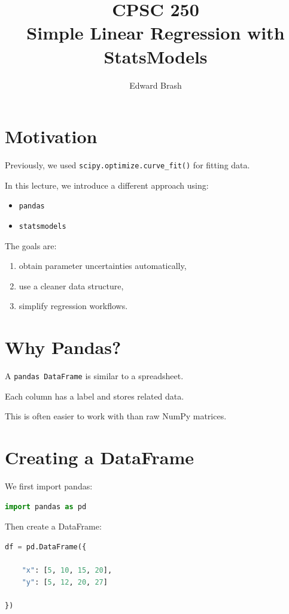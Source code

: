 \documentclass[11pt]{article}
\title{CPSC 250 \\ Simple Linear Regression with StatsModels}
\author{Edward Brash}
\date{}
\begin{document}
\maketitle

\section{Motivation}

Previously, we used \texttt{scipy.optimize.curve\_fit()} for fitting data.

In this lecture, we introduce a different approach using:

\begin{itemize}
    \item \texttt{pandas}
    \item \texttt{statsmodels}
\end{itemize}

The goals are:

\begin{enumerate}
    \item obtain parameter uncertainties automatically,
    \item use a cleaner data structure,
    \item simplify regression workflows.
\end{enumerate}

\section{Why Pandas?}

A \texttt{pandas DataFrame} is similar to a spreadsheet.

Each column has a label and stores related data.

This is often easier to work with than raw NumPy matrices.

\section{Creating a DataFrame}

We first import pandas:

\begin{lstlisting}[language=Python]
import pandas as pd
\end{lstlisting}

Then create a DataFrame:

\begin{lstlisting}[language=Python]
df = pd.DataFrame({

    "x": [5, 10, 15, 20],
    "y": [5, 12, 20, 27]

})
\end{lstlisting}
\end{document}
